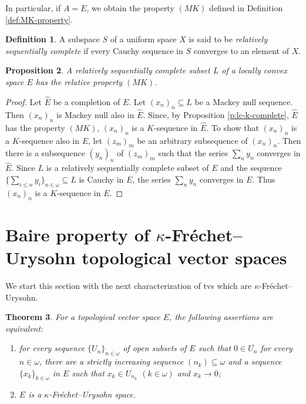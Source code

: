 \documentclass[preprint,11pt]{elsarticle}
\newtheorem{theorem}{Theorem}[section]
\newtheorem{proposition}[theorem]{Proposition}
\theoremstyle{definition}
\newtheorem{definition}[theorem]{Definition}
\theoremstyle{remark}
\numberwithin{equation}{section}
\numberwithin{theorem}{section}
\newcommand{\w}{\omega}
\begin{document}
In particular, if $A=E$, we obtain the property $(MK)$ defined in Definition \ref{def:MK-property}.

\begin{definition}
A subspace $S$ of a uniform space $X$ is said to be {\em relatively sequentially complete} if every Cauchy sequence in $S$ converges to an element of $X$.
\end{definition}


\begin{proposition}\label{p:rsc-rksc}
A relatively sequentially complete  subset $L$ of a locally convex space $E$ has the relative property $(MK)$.
\end{proposition}

\begin{proof}
Let $\widehat E$ be a completion of $E$. Let $(x_n)_{n}\subseteq L$ be a Mackey null sequence. Then $(x_n)_{n}$ is Mackey null also in $\widehat E$. Since, by Proposition \ref{p:lc-k-complete},  $\widehat E$ has the property  $(MK)$, $(x_n)_{n}$ is a $K$-sequence in $\widehat E$. To show that $(x_n)_{n}$ is a $K$-sequence also in $E$, let $(z_m)_m$ be an arbitrary subsequence of  $(x_n)_{n}$. Then there is a subsequence  $(y_n)_{n}$ of  $(z_m)_{m}$ such that the series $\sum_n y_n$ converges in $\widehat E$. Since $L$ is a relatively sequentially complete subset of $E$ and the sequence $\big\{\sum_{i\leq n} y_i\big\}_{n\in\w}\subseteq L$ is Cauchy in $E$, the series $\sum_n y_n$ converges in $E$. Thus $(x_n)_{n}$ is a $K$-sequence in $E$.
\end{proof}



\section{Baire property of $\kappa$-Fr\'{e}chet--Urysohn topological vector spaces  } \label{sec:kFU-Baire1}


We start this section with the next characterization of tvs which are $\kappa$-Fr\'{e}chet--Urysohn.


\begin{theorem} \label{t:kFU-group-charac}
For a topological vector space $E$, the following assertions are equivalent:
\begin{enumerate}
\item[{\rm(i)}] for every sequence $\{U_n\}_{n\in\w}$ of open subsets of $E$ such that $0\in \overline{U_n}$ for every $n\in\w$, there are a strictly increasing sequence $(n_k)\subseteq \w$ and a sequence $\{x_k\}_{k\in\w}$ in $E$ such that $x_k\in U_{n_k}$ $(k\in\w)$ and $x_k\to 0$;
\item[{\rm(ii)}] $E$ is a $\kappa$-Fr\'{e}chet--Urysohn space.
\end{enumerate}
\end{theorem}
\end{document}
